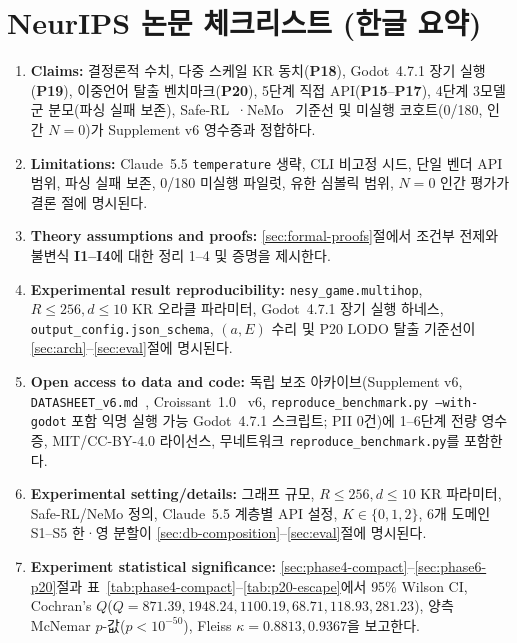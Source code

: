 \documentclass{article}
\begin{document}
\FloatBarrier



\clearpage
\section*{NeurIPS 논문 체크리스트 (한글 요약)}
\begin{enumerate}
\item {\bf Claims:} \answerYes{} 결정론적 수치, 다중 스케일 KR 동치(\textbf{P18}), Godot~4.7.1 장기 실행(\textbf{P19}), 이중언어 탈출 벤치마크(\textbf{P20}), 5단계 직접 API(\textbf{P15}--\textbf{P17}), 4단계 3모델군 분모(파싱 실패 보존), Safe-RL~\cite{alshiekh2018shield}·NeMo~\cite{rebedea2023nemo} 기준선 및 미실행 코호트(0/180, 인간 $N{=}0$)가 Supplement v6 영수증과 정합하다.
\item {\bf Limitations:} \answerYes{} Claude~5.5 \texttt{temperature} 생략, CLI 비고정 시드, 단일 벤더 API 범위, 파싱 실패 보존, 0/180 미실행 파일럿, 유한 심볼릭 범위, $N{=}0$ 인간 평가가 결론 절에 명시된다.
\item {\bf Theory assumptions and proofs:} \answerYes{} \ref{sec:formal-proofs}절에서 조건부 전제와 불변식 \textbf{I1--I4}에 대한 정리 1--4 및 증명을 제시한다.
\item {\bf Experimental result reproducibility:} \answerYes{} \texttt{nesy\_game.multihop}, $R{\le}256, d{\le}10$ KR 오라클 파라미터, Godot~4.7.1 장기 실행 하네스, \texttt{output\_config.json\_schema}, $(a,E)$ 수리 및 P20 LODO 탈출 기준선이 \ref{sec:arch}--\ref{sec:eval}절에 명시된다.
\item {\bf Open access to data and code:} \answerYes{} 독립 보조 아카이브(Supplement v6, \texttt{DATASHEET\_v6.md}~\cite{gebru2021datasheets}, Croissant~1.0~\cite{akhtar2024croissant} v6, \texttt{reproduce\_benchmark.py --with-godot} 포함 익명 실행 가능 Godot~4.7.1 스크립트; PII 0건)에 1--6단계 전량 영수증, MIT/CC-BY-4.0 라이선스, 무네트워크 \texttt{reproduce\_benchmark.py}를 포함한다.
\item {\bf Experimental setting/details:} \answerYes{} 그래프 규모, $R{\le}256, d{\le}10$ KR 파라미터, Safe-RL/NeMo 정의, Claude~5.5 계층별 API 설정, $K\in\{0,1,2\}$, 6개 도메인 S1--S5 한·영 분할이 \ref{sec:db-composition}--\ref{sec:eval}절에 명시된다.
\item {\bf Experiment statistical significance:} \answerYes{} \ref{sec:phase4-compact}--\ref{sec:phase6-p20}절과 표~\ref{tab:phase4-compact}--\ref{tab:p20-escape}에서 95\% Wilson CI, Cochran's $Q$($Q{=}871.39, 1948.24, 1100.19, 68.71, 118.93, 281.23$), 양측 McNemar $p$-값($p < 10^{-50}$), Fleiss $\kappa{=}0.8813, 0.9367$을 보고한다.

\end{enumerate}
\end{document}
